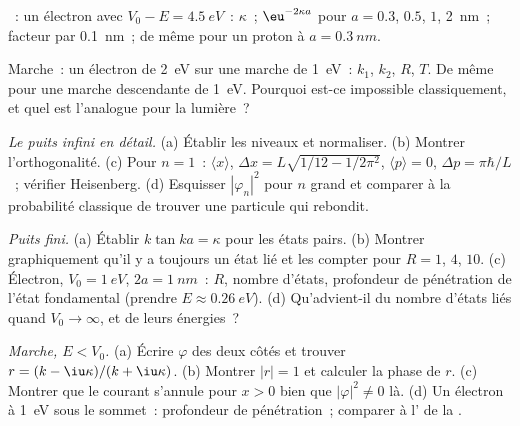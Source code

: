 \begin{exercise}[$\star$]\label{exo:b2:potential-wells-tunneling:3}
~: un électron avec $V_0 - E = \qty{4.5}{eV}$~: $\kappa$~; $\eu^{-2\kappa a}$
pour $a = 0.3$, $0.5$, $1$, \qty{2}{nm}~; facteur par \qty{0.1}{nm}~; de même pour
un proton à $a = \qty{0.3}{nm}$.
\end{exercise}

\begin{exercise}[$\star$]\label{exo:b2:potential-wells-tunneling:4}
Marche~: un électron de \qty{2}{eV} sur une marche de \qty{1}{eV}~: $k_1$, $k_2$,
$R$, $T$. De même pour une marche descendante de \qty{1}{eV}. Pourquoi est-ce impossible
classiquement, et quel est l'analogue pour la lumière~?
\end{exercise}

\begin{exercise}[$\star\star$]\label{exo:b2:potential-wells-tunneling:5}
\emph{Le puits infini en détail.} (a) Établir les niveaux et normaliser.
(b) Montrer l'orthogonalité. (c) Pour $n = 1$~: $\langle x\rangle$, $\Delta x =
L\sqrt{1/12 - 1/2\pi^2}$, $\langle p\rangle = 0$, $\Delta p = \pi\hbar/L$~; vérifier
Heisenberg. (d) Esquisser $|\varphi_n|^2$ pour $n$ grand et comparer à la
probabilité classique de trouver une particule qui rebondit.
\end{exercise}

\begin{exercise}[$\star\star$]\label{exo:b2:potential-wells-tunneling:6}
\emph{Puits fini.} (a) Établir $k\tan ka = \kappa$ pour les états pairs.
(b) Montrer graphiquement qu'il y a toujours un état lié et les compter pour
$R = 1$, $4$, $10$. (c) Électron, $V_0 = \qty{1}{eV}$, $2a = \qty{1}{nm}$~:
$R$, nombre d'états, profondeur de pénétration de l'état fondamental (prendre
$E \approx \qty{0.26}{eV}$). (d) Qu'advient-il du nombre d'états liés
quand $V_0 \to \infty$, et de leurs énergies~?
\end{exercise}

\begin{exercise}[$\star\star$]\label{exo:b2:potential-wells-tunneling:7}
\emph{Marche, $E < V_0$.} (a) Écrire $\varphi$ des deux côtés et trouver $r =
(k - \iu\kappa)/(k + \iu\kappa)$. (b) Montrer $|r| = 1$ et calculer la phase
de $r$. (c) Montrer que le courant s'annule pour $x > 0$ bien que $|\varphi|^2 \ne
0$ là. (d) Un électron à \qty{1}{eV} sous le sommet~: profondeur de pénétration~;
comparer à l' de la .
\end{exercise}

